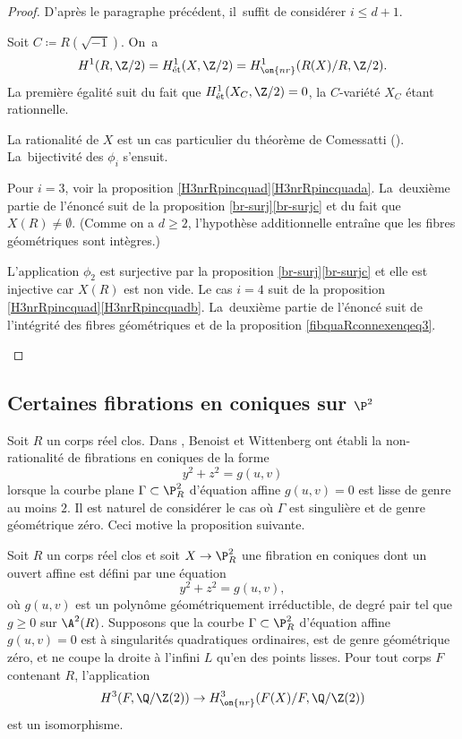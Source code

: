 \begin{proof}
D'après le paragraphe précédent, il~suffit de considérer $i\leq d+1$.

\begin{enumeratea}
\item\label{pf:a}
Soit $C\coloneqq R(\sqrt{-1})$. On~a
\[H^1(R,\Z/2)=H^1_{\text{ét}}(X,\Z/2)=H^1_{\on{nr}}(R(X)/R,\Z/2).\]
La première égalité suit du fait que $H^1_{\text{ét}}(X_C,\Z/2)=0$, la $C$-variété $X_C$ étant rationnelle.

\item\label{pf:b}
La rationalité de $X$ est un cas particulier du théorème de Comessatti \cite{comessatti1912fondamenti} (\cf \cite[\S10.2]{colliot2024certaines}). La~bijectivité des $\phi_i$ s'ensuit.

\item\label{pf:c}
Pour $i=3$, voir la proposition \ref{H3nrRpincquad}\eqref{H3nrRpincquada}. La~deuxième partie de l'énoncé suit de la proposition \ref{br-surj}\eqref{br-surjc} et du fait que $X(R)\neq \emptyset$. (Comme on a $d\geq 2$, l'hypothèse additionnelle entraîne que les fibres géométriques sont intègres.)

\item\label{pf:d}
L'application $\phi_2$ est surjective par la proposition \ref{br-surj}\eqref{br-surjc} et elle est injective car $X(R)$ est non vide. Le cas $i=4$ suit de la proposition \ref{H3nrRpincquad}\eqref{H3nrRpincquadb}. La~deuxième partie de l'énoncé suit de l’intégrité des fibres géométriques et de la proposition \ref{fibquaRconnexenqeq3}.\qedhere
\end{enumeratea}
\end{proof}

\subsection{Certaines fibrations en coniques sur \texorpdfstring{$\P^2$}{P2}}
Soit $R$ un corps réel clos. Dans \cite[Prop.\,3.4, Cor.\,3.6]{benoist2020clemens}, Benoist et Wittenberg ont établi la non-rationalité de fibrations en coniques de la forme
\[
y^2+z^2=g(u,v)
\]
lorsque la courbe plane $\Gamma\subset \P^2_R$ d'équation affine $g(u,v)=0$ est lisse de genre au moins $2$. Il est naturel de considérer le cas où $\Gamma$ est singulière et de genre géométrique zéro. Ceci motive la proposition suivante.

\begin{prop}\label{BeWi}
Soit $R$ un corps réel clos et soit $X \to \P^2_{R}$ une fibration en coniques dont un ouvert affine est
défini par une équation
\[
y^2+z^2=g(u,v),
\]
où $g(u,v)$ est un polynôme géométriquement irréductible,
de degré pair tel que $g\geq 0$ sur $\A^2(R)$.
Supposons que la courbe $\Gamma \subset \P^2_R$ d'équation affine $g(u,v)=0$ est à singularités quadratiques ordinaires, est de genre géométrique zéro, et ne coupe la droite
à l'infini $L$ qu'en des points lisses. Pour tout corps $F$ contenant $R$,
l'application
\[
H^3(F,\Q/\Z(2)) \to H^3_{\on{nr}}(F(X)/F,\Q/\Z(2))
\]
est un isomorphisme.
\end{prop}

